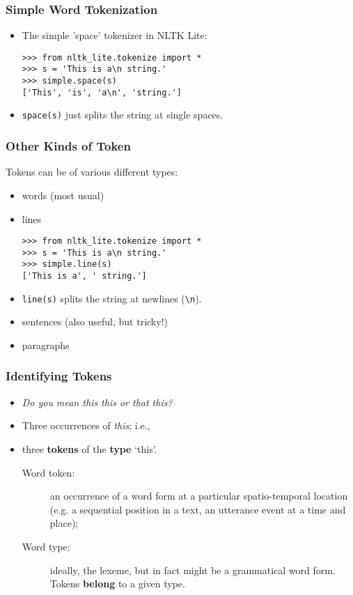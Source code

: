 \begin{frame}[fragile]
  \frametitle{Simple Word Tokenization}

  \begin{itemize}
  \item<1->  The simple 'space' tokenizer in NLTK Lite:
\begin{verbatim}
>>> from nltk_lite.tokenize import *
>>> s = 'This is a\n string.' 
>>> simple.space(s)
['This', 'is', 'a\n', 'string.']  
\end{verbatim}
  \item<2-> \verb!space(s)! just splits the string at single spaces.
  \end{itemize}
\end{frame}


\begin{frame}[fragile]
  \frametitle{Other Kinds of Token}

Tokens can be of various different types:
\begin{itemize}
\item<1-> words (most usual)
\item<2-> lines
\begin{verbatim}
>>> from nltk_lite.tokenize import *
>>> s = 'This is a\n string.' 
>>> simple.line(s)
['This is a', ' string.'] 
\end{verbatim}

\item<2-> \verb!line(s)! splits the string at newlines (\verb!\n!).
\item<3-> sentences (also useful, but tricky!)
\item<4-> paragraphs
\end{itemize}


\end{frame}


\begin{frame}[fragile]
  \frametitle{Identifying Tokens}

    \begin{itemize}
    \item \textit{Do you mean this this or that this?}
    \item Three occurrences of \textit{this}; i.e.,
    \item three \textbf{tokens} of the \textbf{type} `this'.
    \begin{description}
    \item [Word token:] an occurrence of a word form at a particular
      spatio-temporal location (e.g. a sequential position in a text,
      an utterance event at a time and place);
    \item [Word type:] ideally, the lexeme, but in fact might be a
      grammatical word form.
      Tokens \textbf{belong} to a given type. 
      \end{description}
    \end{itemize}
\end{frame}

